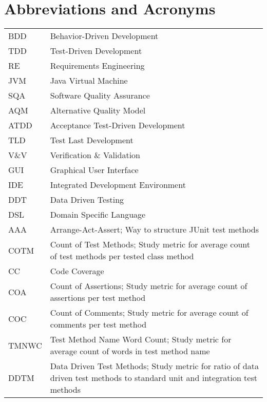 \chapter*{Abbreviations and Acronyms}


\noindent
\begin{longtable}{@{}p{}p{}@{}}
BDD & Behavior-Driven Development \\
TDD & Test-Driven Development \\
RE & Requirements Engineering \\
JVM & Java Virtual Machine \\
SQA & Software Quality Assurance \\
AQM & Alternative Quality Model \\
ATDD & Acceptance Test-Driven Development \\
TLD & Test Last Development \\
V\&V & Verification \& Validation \\
GUI & Graphical User Interface \\
IDE & Integrated Development Environment \\
DDT & Data Driven Testing \\
DSL & Domain Specific Language \\
AAA & Arrange-Act-Assert; Way to structure JUnit test methods \\
COTM & Count of Test Methods; Study metric for average count of test methods per tested class method \\
CC & Code Coverage \\
COA & Count of Assertions; Study metric for average count of assertions per test method \\
COC & Count of Comments; Study metric for average count of comments per test method \\
TMNWC & Test Method Name Word Count; Study metric for average count of words in test method name \\
DDTM & Data Driven Test Methods; Study metric for ratio of data driven test methods to standard unit and integration test methods \\
\end{longtable}
